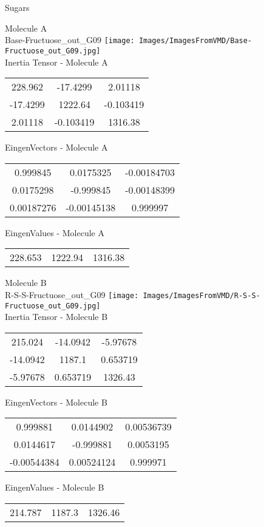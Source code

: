 \vtab[-2cm]
\begin{center}
{\large Sugars}
\end{center}
\begin{multicols}{2}
\begin{center}
Molecule A \\ 
Base-Fructuose\_out\_G09
\texttt{[image: Images/ImagesFromVMD/Base-Fructuose\_out\_G09.jpg]}
\\
Inertia Tensor - Molecule A \\
\vtab
\begin{tabular}{|c c c|}
228.962	 & 	-17.4299	 & 	2.01118	 \\
-17.4299	 & 	1222.64	 & 	-0.103419	 \\
2.01118	 & 	-0.103419	 & 	1316.38
\end{tabular}

\vtab
 EingenVectors - Molecule A     \\
\vtab
\begin{tabular}{|c c c|}
0.999845	 & 	0.0175325	 & 	-0.00184703	 \\
0.0175298	 & 	-0.999845	 & 	-0.00148399	 \\
0.00187276	 & 	-0.00145138	 & 	0.999997
\end{tabular}

\vtab
 EingenValues - Molecule A     \\
\vtab
\begin{tabular}{|c c c|}
228.653	 & 	1222.94	 & 	1316.38
\end{tabular}
\columnbreak

Molecule B \\ 
R-S-S-Fructuose\_out\_G09
\texttt{[image: Images/ImagesFromVMD/R-S-S-Fructuose\_out\_G09.jpg]}
\\
Inertia Tensor - Molecule B \\
\vtab
\begin{tabular}{|c c c|}
215.024	 & 	-14.0942	 & 	-5.97678	 \\
-14.0942	 & 	1187.1	 & 	0.653719	 \\
-5.97678	 & 	0.653719	 & 	1326.43
\end{tabular}

\vtab
 EingenVectors - Molecule B     \\
\vtab
\begin{tabular}{|c c c|}
0.999881	 & 	0.0144902	 & 	0.00536739	 \\
0.0144617	 & 	-0.999881	 & 	0.0053195	 \\
-0.00544384	 & 	0.00524124	 & 	0.999971
\end{tabular}

\vtab
 EingenValues - Molecule B     \\
\vtab
\begin{tabular}{|c c c|}
214.787	 & 	1187.3	 & 	1326.46
\end{tabular}

\end{center}
\end{multicols}
